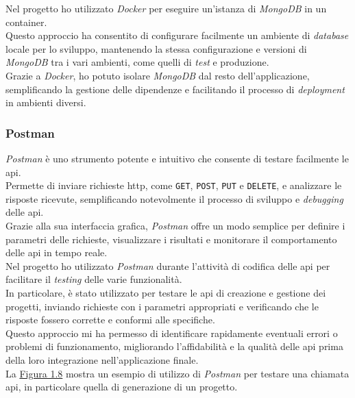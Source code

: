 \noindent Nel progetto ho utilizzato \textit{Docker} per eseguire un'istanza di \textit{MongoDB} in un \gls{container}.\\
Questo approccio ha consentito di configurare facilmente un ambiente di \textit{database} locale per lo sviluppo, mantenendo la stessa configurazione e versioni di \textit{MongoDB} tra i vari ambienti, come quelli di \textit{test} e produzione.\\
Grazie a \textit{Docker}, ho potuto isolare \textit{MongoDB} dal resto dell'applicazione, semplificando la gestione delle dipendenze e facilitando il processo di \textit{deployment} in ambienti diversi.

\subsubsection{Postman}

\textit{Postman} è uno strumento potente e intuitivo che consente di testare facilmente le \gls{api}.\\
Permette di inviare richieste \gls{http}, come \texttt{GET}, \texttt{POST}, \texttt{PUT} e \texttt{DELETE}, e analizzare le risposte ricevute, semplificando notevolmente il processo di sviluppo e \textit{debugging} delle \gls{api}.\\
Grazie alla sua interfaccia grafica, \textit{Postman} offre un modo semplice per definire i parametri delle richieste, visualizzare i risultati e monitorare il comportamento delle \gls{api} in tempo reale.\\

\noindent Nel progetto ho utilizzato \textit{Postman} durante l'attività di codifica delle \gls{api} per facilitare il \textit{testing} delle varie funzionalità.\\
In particolare, è stato utilizzato per testare le \gls{api} di creazione e gestione dei progetti, inviando richieste con i parametri appropriati e verificando che le risposte fossero corrette e conformi alle specifiche.\\ 
Questo approccio mi ha permesso di identificare rapidamente eventuali errori o problemi di funzionamento, migliorando l'affidabilità e la qualità delle \gls{api} prima della loro integrazione nell'applicazione finale.\\

\noindent La {\hyperref[fig:postman]{Figura 1.8}} mostra un esempio di utilizzo di \textit{Postman} per testare una chiamata \gls{api}, in particolare quella di generazione di un progetto.

